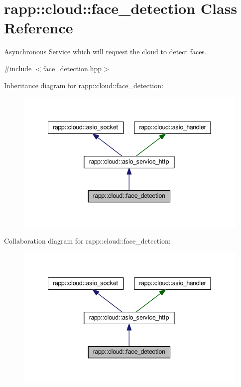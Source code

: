 \hypertarget{classrapp_1_1cloud_1_1face__detection}{\section{rapp\-:\-:cloud\-:\-:face\-\_\-detection Class Reference}
\label{classrapp_1_1cloud_1_1face__detection}
}


Asynchronous Service which will request the cloud to detect faces.  




{\ttfamily \#include $<$face\-\_\-detection.\-hpp$>$}



Inheritance diagram for rapp\-:\-:cloud\-:\-:face\-\_\-detection\-:
\nopagebreak
\begin{figure}[H]
\begin{center}
\leavevmode
\includegraphics[width=345pt]{classrapp_1_1cloud_1_1face__detection__inherit__graph}
\end{center}
\end{figure}


Collaboration diagram for rapp\-:\-:cloud\-:\-:face\-\_\-detection\-:
\nopagebreak
\begin{figure}[H]
\begin{center}
\leavevmode
\includegraphics[width=345pt]{classrapp_1_1cloud_1_1face__detection__coll__graph}
\end{center}
\end{figure}
